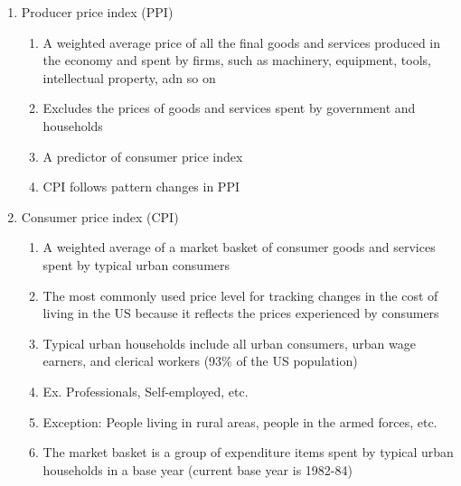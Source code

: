 \documentclass[12pt]{article}
\begin{document}
\begin{enumerate}
\begin{enumerate}
\begin{enumerate}
\begin{enumerate}
                \end{enumerate}

              \item Producer price index (PPI)

                \begin{enumerate}

                  \item A weighted average price of all the final goods and services produced in the economy and spent by firms, such as machinery, equipment, tools, intellectual property, adn so on

                  \item Excludes the prices of goods and services spent by government and households

                  \item A predictor of consumer price index

                  \item CPI follows pattern changes in PPI

                \end{enumerate}

              \item Consumer price index (CPI)

                \begin{enumerate}

                  \item A weighted average of a market basket of consumer goods and services spent by typical urban consumers

                  \item The most commonly used price level for tracking changes in the cost of living in the US because it reflects the prices experienced by consumers

                  \item Typical urban households include all urban consumers, urban wage earners, and clerical workers (93\% of the US population)

                  \item Ex. Professionals, Self-employed, etc.

                  \item Exception: People living in rural areas, people in the armed forces, etc.

                  \item The market basket is a group of expenditure items spent by typical urban households in a base year (current base year is 1982-84)


\end{enumerate}
\end{enumerate}
\end{enumerate}
\end{enumerate}
\end{document}
